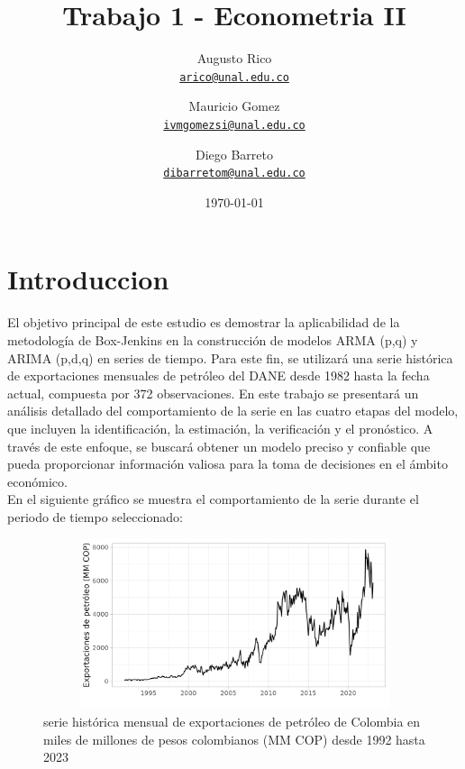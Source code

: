 \documentclass[11pt]{article}
\title{Trabajo 1 - Econometria II
}
\author{Augusto Rico\\%
    \href{mailto:arico@unal.edu.co}{\texttt{arico@unal.edu.co}} %
\and Mauricio Gomez\\%
    \href{mailto:ivmgomezsi@unal.edu.co}{\texttt{ivmgomezsi@unal.edu.co}} %
\and Diego Barreto\\%
    \href{mailto:dibarretom@unal.edu.co}{\texttt{dibarretom@unal.edu.co}}%
    }
\date{\today}
\begin{document}
\maketitle


\section{Introduccion}

    El objetivo principal de este estudio es demostrar la aplicabilidad de la metodología de Box-Jenkins en la construcción de modelos ARMA (p,q) y ARIMA (p,d,q) en series de tiempo. Para este fin, se utilizará una serie histórica de exportaciones mensuales de petróleo del DANE desde 1982 hasta la fecha actual, compuesta por 372 observaciones. En este trabajo se presentará un análisis detallado del comportamiento de la serie en las cuatro etapas del modelo, que incluyen la identificación, la estimación, la verificación y el pronóstico. A través de este enfoque, se buscará obtener un modelo preciso y confiable que pueda proporcionar información valiosa para la toma de decisiones en el ámbito económico.\\
    En el siguiente gráfico se muestra el comportamiento de la serie durante el periodo de tiempo seleccionado:


\begin{center}
    \begin{figure}[!ht]
      \centering
      \includegraphics[width=12cm, height=5cm]{Imagenes/ts.png}
      \caption{serie histórica mensual de exportaciones de petróleo de Colombia en miles de millones de pesos colombianos (MM COP) desde 1992 hasta 2023}
      \vspace{0cm}
    \end{figure}
  \end{center}
  
\end{document}
